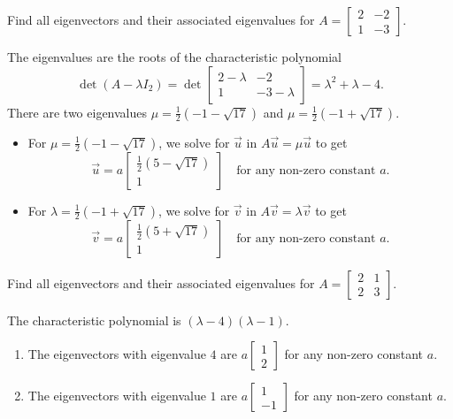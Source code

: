 \documentclass[../main.tex]{subfiles}
\begin{document}
\begin{exercise}
  Find all eigenvectors and their associated eigenvalues for \(A = \begin{bmatrix} 2 & -2 \\ 1 & -3 \end{bmatrix}\).

  \begin{solution}
    The eigenvalues are the roots of the characteristic polynomial \[\det(A - \lambda I_{2}) = \det \begin{bmatrix} 2 - \lambda & -2 \\ 1 & -3 - \lambda \end{bmatrix} = \lambda^{2} + \lambda - 4.\]
    There are two eigenvalues \(\mu = \frac{1}{2}(-1 - \sqrt{17})\) and \(\mu = \frac{1}{2}(-1 + \sqrt{17})\).

    \begin{itemize}
      \item For \(\mu = \frac{1}{2}(-1 - \sqrt{17})\), we solve for \(\vec{u}\) in \(A \vec{u} = \mu \vec{u}\) to get
        \[
          \vec{u} = a \begin{bmatrix} \frac{1}{2}(5 - \sqrt{17}) \\ 1 \end{bmatrix}
          \quad\text{for any non-zero constant } a.
        \]
      \item For \(\lambda = \frac{1}{2}(-1 + \sqrt{17})\), we solve for \(\vec{v}\) in \(A \vec{v} = \lambda \vec{v}\) to get
        \[
          \vec{v} = a \begin{bmatrix} \frac{1}{2}(5 + \sqrt{17}) \\ 1 \end{bmatrix}
          \quad\text{for any non-zero constant } a.
        \]
    \end{itemize}
  \end{solution}
\end{exercise}

\begin{exercise}
  Find all eigenvectors and their associated eigenvalues for \(A = \begin{bmatrix} 2 & 1 \\ 2 & 3 \end{bmatrix}\).

  \begin{solution}
    The characteristic polynomial is \((\lambda-4)(\lambda-1)\).  

    \begin{enumerate}
      \item The eigenvectors with eigenvalue \(4\) are \(a\begin{bmatrix} 1 \\ 2\end{bmatrix}\) for any non-zero constant \(a\).
      \item The eigenvectors with eigenvalue \(1\) are \(a\begin{bmatrix} 1 \\ -1\end{bmatrix}\) for any non-zero constant \(a\).
    \end{enumerate}
  \end{solution}
\end{exercise}
\end{document}

